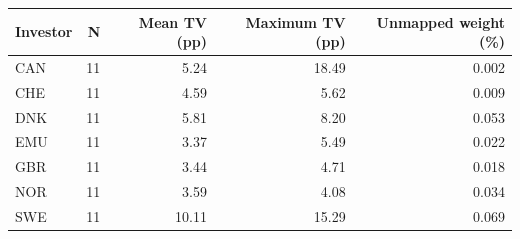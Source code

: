 \begin{tabular}{lrrrr}
\toprule
Investor & N & Mean TV (pp) & Maximum TV (pp) & Unmapped weight (\%) \\
\midrule
CAN & 11 & 5.24 & 18.49 & 0.002 \\
CHE & 11 & 4.59 & 5.62 & 0.009 \\
DNK & 11 & 5.81 & 8.20 & 0.053 \\
EMU & 11 & 3.37 & 5.49 & 0.022 \\
GBR & 11 & 3.44 & 4.71 & 0.018 \\
NOR & 11 & 3.59 & 4.08 & 0.034 \\
SWE & 11 & 10.11 & 15.29 & 0.069 \\
\bottomrule
\end{tabular}
